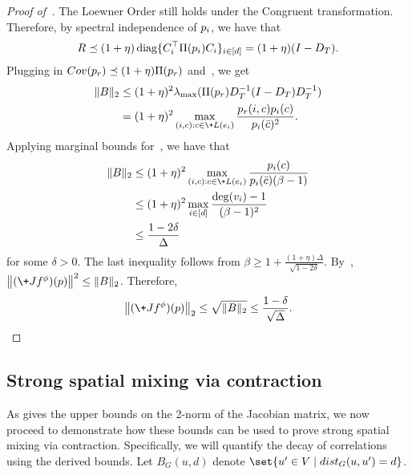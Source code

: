 \documentclass[a4paper,11pt]{article}
\renewcommand{\norm}[1]{\left\|#1\right\|}
\begin{document}
\begin{proof}[Proof of~]
The Loewner Order still holds under the Congruent transformation. 
Therefore, by spectral independence of $\*p_i$, we have that
\begin{align}\label{eq:bound_R}
    \*R \preceq (1+\eta)\operatorname{diag}\{C^\top_i\Pi(\*p_i)C_i\}_{i\in [d]}
    = (1+\eta)(I - D_T).
\end{align}
Plugging in $\-{Cov}(\*p_r)\preceq (1+\eta)\Pi(\*p_r)$ and~, we get
\begin{align}
    \nonumber \|\*B\|_2 &\leq (1+\eta)^2\lambda_{\max}(\Pi(\*p_r)D_T^{-1}(I - D_T)D_T^{-1})
    \\ \label{eq:marginal_equation} &= (1+\eta)^2\max_{(i,c): c\in \+L(e_i)} \frac{\*p_r(i,c)\*p_i(c)}{\*p_i(\bar{c})^2}.
\end{align}
Applying marginal bounds for~, we have that
\begin{align*}
    \|\*B\|_2  &\leq (1+\eta)^2\max_{(i,c): c\in \+L(e_i)} \frac{\*p_i(c)}{\*p_i(\bar{c})(\beta - 1)}
    \\&\leq (1+\eta)^2\max_{i\in[d]} \frac{\deg(v_i)-1}{(\beta - 1)^2} 
    \\&\leq \frac {1 - 2\delta}{\Delta}
\end{align*}
for some $\delta > 0$.
The last inequality follows from $\beta \geq 1 + \frac{(1 + \eta)\Delta}{\sqrt{1 - 2\delta}}$.
By~, $\norm{(\+J f^\phi)(\*p)}^2 \leq \|\*B\|_2$.
Therefore, 
\[
    \norm{(\+J f^\phi)(\*p)}_2 \leq \sqrt{\|\*B\|_2} \leq \frac{1-\delta}{\sqrt \Delta}.
    \qedhere
\]
\end{proof}
\subsection{Strong spatial mixing via contraction}\label{sec:contraction}
\newcommand{\ra}{\rightarrow}
As  gives the upper bounds on the 2-norm of the Jacobian matrix, we now proceed to demonstrate how these bounds can be used to prove strong spatial mixing via contraction. Specifically, we will quantify the decay of correlations using the derived bounds.
Let $B_{G}(u,d)$ denote $\set{u'\in V\mid \dist_G(u,u') = d}$.
\end{document}
